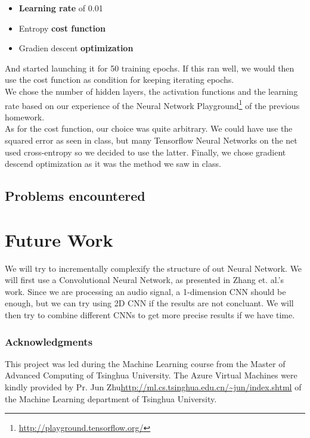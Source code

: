 \documentclass{article} %
\begin{document}
\begin{enumerate}
\begin{itemize}
						\item \textbf{Learning rate} of 0.01
						\item Entropy \textbf{cost function}
						\item Gradien descent \textbf{optimization}
					\end{itemize}
					And started launching it for 50 training epochs. If this ran well, we would then use the cost function as condition for keeping iterating epochs.\\
					We chose the number of hidden layers, the activation functions and the learning rate based on our experience of the Neural Network Playground\footnote{\url{http://playground.tensorflow.org/}} of the previous homework.\\
					As for the cost function, our choice was quite arbitrary. We could have use the squared error as seen in class, but many Tensorflow Neural Networks on the net used cross-entropy so we decided to use the latter. Finally, we chose gradient descend optimization as it was the method we saw in class.
			\end{enumerate}


		\subsection{Problems encountered}

\section{Future Work}
	We will try to incrementally complexify the structure of out Neural Network. We will first use a Convolutional Neural Network, as presented in Zhang et. al.'s work\cite{cite6}. Since we are processing an audio signal, a 1-dimension CNN should be enough, but we can try using 2D CNN if the results are not concluant. We will then try to combine different CNNs to get more precise results if we have time.

\subsubsection*{Acknowledgments}

	This project was led during the Machine Learning course from the Master of Advanced Computing of Tsinghua University. The Azure Virtual Machines were kindly provided by Pr. Jun Zhu\url{http://ml.cs.tsinghua.edu.cn/~jun/index.shtml} of the Machine Learning department of Tsinghua University.

\nocite{*}


\end{document}
